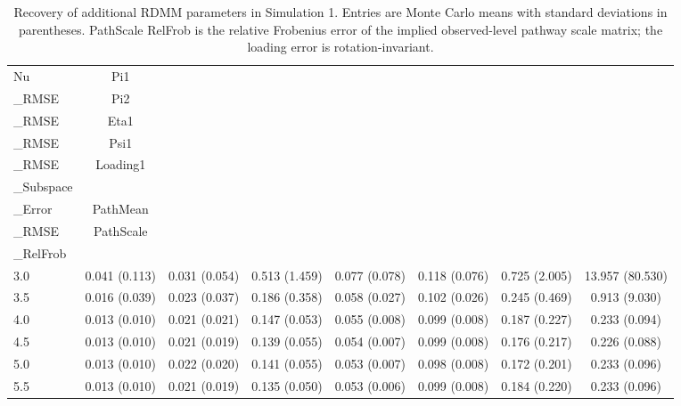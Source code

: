 \begin{table}[!ht]
\centering
\caption{Recovery of additional RDMM parameters in Simulation 1. Entries are Monte Carlo means with standard deviations in parentheses. PathScale RelFrob is the relative Frobenius error of the implied observed-level pathway scale matrix; the loading error is rotation-invariant.}
\label{tab:study1-parameter-recovery}
\begin{tabular}{lccccccc}
\hline
Nu & Pi1\\_RMSE & Pi2\\_RMSE & Eta1\\_RMSE & Psi1\\_RMSE & Loading1\\_Subspace\\_Error & PathMean\\_RMSE & PathScale\\_RelFrob \\
\hline
3.0 & 0.041 (0.113) & 0.031 (0.054) & 0.513 (1.459) & 0.077 (0.078) & 0.118 (0.076) & 0.725 (2.005) & 13.957 (80.530) \\
3.5 & 0.016 (0.039) & 0.023 (0.037) & 0.186 (0.358) & 0.058 (0.027) & 0.102 (0.026) & 0.245 (0.469) & 0.913 (9.030) \\
4.0 & 0.013 (0.010) & 0.021 (0.021) & 0.147 (0.053) & 0.055 (0.008) & 0.099 (0.008) & 0.187 (0.227) & 0.233 (0.094) \\
4.5 & 0.013 (0.010) & 0.021 (0.019) & 0.139 (0.055) & 0.054 (0.007) & 0.099 (0.008) & 0.176 (0.217) & 0.226 (0.088) \\
5.0 & 0.013 (0.010) & 0.022 (0.020) & 0.141 (0.055) & 0.053 (0.007) & 0.098 (0.008) & 0.172 (0.201) & 0.233 (0.096) \\
5.5 & 0.013 (0.010) & 0.021 (0.019) & 0.135 (0.050) & 0.053 (0.006) & 0.099 (0.008) & 0.184 (0.220) & 0.233 (0.096) \\
\hline
\end{tabular}
\end{table}
